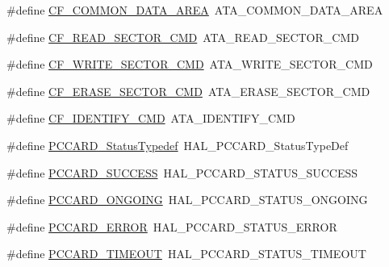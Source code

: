 \begin{DoxyCompactItemize}
\item 
\#define \hyperlink{group___h_a_l___p_c_c_a_r_d___aliased___defines_gaf18f5166dd0d0152033945d9d223fda0}{C\+F\+\_\+\+C\+O\+M\+M\+O\+N\+\_\+\+D\+A\+T\+A\+\_\+\+A\+R\+EA}~A\+T\+A\+\_\+\+C\+O\+M\+M\+O\+N\+\_\+\+D\+A\+T\+A\+\_\+\+A\+R\+EA
\item 
\#define \hyperlink{group___h_a_l___p_c_c_a_r_d___aliased___defines_ga75cde56e16d0b780d938df584abbfd99}{C\+F\+\_\+\+R\+E\+A\+D\+\_\+\+S\+E\+C\+T\+O\+R\+\_\+\+C\+MD}~A\+T\+A\+\_\+\+R\+E\+A\+D\+\_\+\+S\+E\+C\+T\+O\+R\+\_\+\+C\+MD
\item 
\#define \hyperlink{group___h_a_l___p_c_c_a_r_d___aliased___defines_ga8d78bcf3fd4df3c59d3b58c2e9587082}{C\+F\+\_\+\+W\+R\+I\+T\+E\+\_\+\+S\+E\+C\+T\+O\+R\+\_\+\+C\+MD}~A\+T\+A\+\_\+\+W\+R\+I\+T\+E\+\_\+\+S\+E\+C\+T\+O\+R\+\_\+\+C\+MD
\item 
\#define \hyperlink{group___h_a_l___p_c_c_a_r_d___aliased___defines_gacc942fb15ebc321378fa4c0cd2b7cdde}{C\+F\+\_\+\+E\+R\+A\+S\+E\+\_\+\+S\+E\+C\+T\+O\+R\+\_\+\+C\+MD}~A\+T\+A\+\_\+\+E\+R\+A\+S\+E\+\_\+\+S\+E\+C\+T\+O\+R\+\_\+\+C\+MD
\item 
\#define \hyperlink{group___h_a_l___p_c_c_a_r_d___aliased___defines_ga93bc172b08e255eb36b60a7c66ce318b}{C\+F\+\_\+\+I\+D\+E\+N\+T\+I\+F\+Y\+\_\+\+C\+MD}~A\+T\+A\+\_\+\+I\+D\+E\+N\+T\+I\+F\+Y\+\_\+\+C\+MD
\item 
\#define \hyperlink{group___h_a_l___p_c_c_a_r_d___aliased___defines_ga93e46d977fc27c9288156eb21819d6e7}{P\+C\+C\+A\+R\+D\+\_\+\+Status\+Typedef}~H\+A\+L\+\_\+\+P\+C\+C\+A\+R\+D\+\_\+\+Status\+Type\+Def
\item 
\#define \hyperlink{group___h_a_l___p_c_c_a_r_d___aliased___defines_gafc1ae843cb9eb6a85eaa4e0288bffe56}{P\+C\+C\+A\+R\+D\+\_\+\+S\+U\+C\+C\+E\+SS}~H\+A\+L\+\_\+\+P\+C\+C\+A\+R\+D\+\_\+\+S\+T\+A\+T\+U\+S\+\_\+\+S\+U\+C\+C\+E\+SS
\item 
\#define \hyperlink{group___h_a_l___p_c_c_a_r_d___aliased___defines_ga85d55fedbb9639c9dc9fa91a73cc3c7e}{P\+C\+C\+A\+R\+D\+\_\+\+O\+N\+G\+O\+I\+NG}~H\+A\+L\+\_\+\+P\+C\+C\+A\+R\+D\+\_\+\+S\+T\+A\+T\+U\+S\+\_\+\+O\+N\+G\+O\+I\+NG
\item 
\#define \hyperlink{group___h_a_l___p_c_c_a_r_d___aliased___defines_gaf60d802224c0c8b695e35d8dc678aa60}{P\+C\+C\+A\+R\+D\+\_\+\+E\+R\+R\+OR}~H\+A\+L\+\_\+\+P\+C\+C\+A\+R\+D\+\_\+\+S\+T\+A\+T\+U\+S\+\_\+\+E\+R\+R\+OR
\item 
\#define \hyperlink{group___h_a_l___p_c_c_a_r_d___aliased___defines_gae83adf7b05e929d55697cffeeea86776}{P\+C\+C\+A\+R\+D\+\_\+\+T\+I\+M\+E\+O\+UT}~H\+A\+L\+\_\+\+P\+C\+C\+A\+R\+D\+\_\+\+S\+T\+A\+T\+U\+S\+\_\+\+T\+I\+M\+E\+O\+UT
\end{DoxyCompactItemize}


